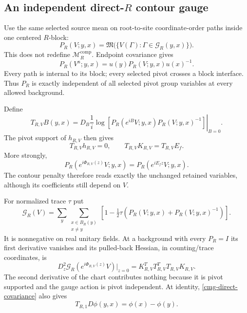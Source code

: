 \documentclass[11pt]{article}
\theoremstyle{remark}
\begin{document}
\subsection{An independent direct-$R$ contour gauge}
\label{cmg-gauge-section}

Use the same selected source mean on root-to-site coordinate-order
paths inside one centered $R$-block:
\begin{equation}
 P_R(V;y,x)=
 \mathfrak M\bigl(\{V(\Gamma):\Gamma\in\mathcal G_R(y,x)\}\bigr).
 \label{cmg-direct-contour}
\end{equation}
This does not redefine $\mathcal M_R^{\mathrm{comp}}$. Endpoint
covariance gives
\begin{equation}
 P_R(V^u;y,x)=u(y)P_R(V;y,x)u(x)^{-1}.
 \label{cmg-direct-covariance}
\end{equation}
Every path is internal to its block; every selected pivot crosses a
block interface. Thus $P_R$ is exactly independent of all selected
pivot group variables at every allowed background.

Define
\begin{equation}
 T_{R,V}B(y,x)=
 D_B\left.\frac1i\log[
 P_R(e^{iB}V;y,x)P_R(V;y,x)^{-1}]\right|_{B=0}.
 \label{cmg-T-definition}
\end{equation}
The pivot support of $h_{R,V}$ then gives
\begin{equation}
 T_{R,V}h_{R,V}=0,\qquad
 T_{R,V}K_{R,V}=T_{R,V}E_f.
 \label{cmg-T-identities}
\end{equation}
More strongly,
\begin{equation}
 P_R(e^{i\Phi_{R,V}(z)}V;y,x)
       =P_R(e^{iE_fz}V;y,x).
 \label{cmg-gauge-retained}
\end{equation}
The contour penalty therefore reads exactly the unchanged retained
variables, although its coefficients still depend on $V$.

For normalized trace $\tau$ put
\begin{equation}
 \mathcal G_R(V)=\sum_y\sum_{\substack{x\in B_R(y)\\x\ne y}}
       \left[1-\tfrac12\tau(P_R(V;y,x)+P_R(V;y,x)^{-1})\right].
 \label{cmg-gauge-action}
\end{equation}
It is nonnegative on real unitary fields. At a background with every
$P_R=I$ its first derivative vanishes and its pulled-back Hessian,
in counting/trace coordinates, is
\begin{equation}
 D_z^2\mathcal G_R(e^{i\Phi_{R,V}(z)}V)\big|_{z=0}
       =K_{R,V}^{T}T_{R,V}^{T}T_{R,V}K_{R,V}.
 \label{cmg-gauge-hessian}
\end{equation}
The second derivative of the chart contributes nothing because it
is pivot supported and the gauge action is pivot independent. At
identity, \eqref{cmg-direct-covariance} also gives
\begin{equation}
 T_{R,1}D\phi(y,x)=\phi(x)-\phi(y).
 \label{cmg-T-gradient}
\end{equation}
\end{document}
